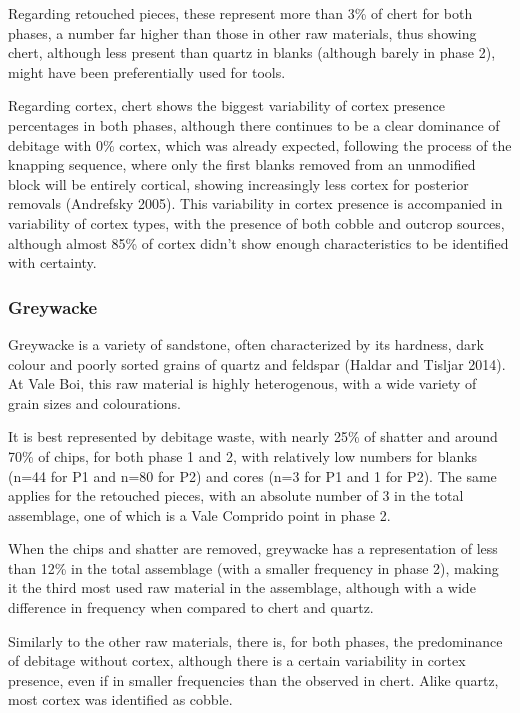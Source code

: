 \documentclass[12pt,twoside]{reedthesis}
\begin{document}
Regarding retouched pieces, these represent more than 3\% of chert for both phases, a number far higher than those in other raw materials, thus showing chert, although less present than quartz in blanks (although barely in phase 2), might have been preferentially used for tools.

Regarding cortex, chert shows the biggest variability of cortex presence percentages in both phases, although there continues to be a clear dominance of debitage with 0\% cortex, which was already expected, following the process of the knapping sequence, where only the first blanks removed from an unmodified block will be entirely cortical, showing increasingly less cortex for posterior removals (Andrefsky 2005). This variability in cortex presence is accompanied in variability of cortex types, with the presence of both cobble and outcrop sources, although almost 85\% of cortex didn't show enough characteristics to be identified with certainty.

\hypertarget{greywacke}{%
\subsubsection{Greywacke}\label{greywacke}}

Greywacke is a variety of sandstone, often characterized by its hardness, dark colour and poorly sorted grains of quartz and feldspar (Haldar and Tisljar 2014). At Vale Boi, this raw material is highly heterogenous, with a wide variety of grain sizes and colourations.

It is best represented by debitage waste, with nearly 25\% of shatter and around 70\% of chips, for both phase 1 and 2, with relatively low numbers for blanks (n=44 for P1 and n=80 for P2) and cores (n=3 for P1 and 1 for P2). The same applies for the retouched pieces, with an absolute number of 3 in the total assemblage, one of which is a Vale Comprido point in phase 2.

When the chips and shatter are removed, greywacke has a representation of less than 12\% in the total assemblage (with a smaller frequency in phase 2), making it the third most used raw material in the assemblage, although with a wide difference in frequency when compared to chert and quartz.

Similarly to the other raw materials, there is, for both phases, the predominance of debitage without cortex, although there is a certain variability in cortex presence, even if in smaller frequencies than the observed in chert. Alike quartz, most cortex was identified as cobble.
\end{document}
